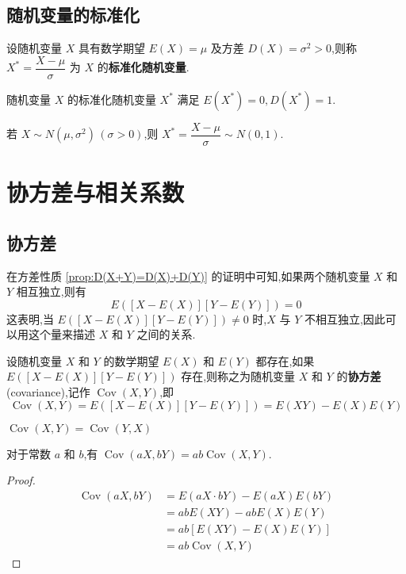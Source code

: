 \subsection{随机变量的标准化}

设随机变量 $X$ 具有数学期望 $E(X)=\mu$ 及方差 $D(X) = \sigma^2 > 0$,则称 $X^* = \dfrac{X-\mu}{\sigma}$ 为 $X$ 的\textbf{标准化随机变量}.

随机变量 $X$ 的标准化随机变量 $X^*$ 满足 $E(X^*)=0, D(X^*)=1$.

\vspace{0.5em}

若 $X \sim N(\mu,\sigma^2) \, (\sigma > 0)$,则 $X^* = \dfrac{X-\mu}{\sigma} \sim N(0,1)$.

\section{协方差与相关系数}

\subsection{协方差}

在方差性质 \ref*{prop:D(X+Y)=D(X)+D(Y)} 的证明中可知,如果两个随机变量 $X$ 和 $Y$ 相互独立,则有
$$
E([X-E(X)][Y-E(Y)]) = 0
$$
这表明,当 $E([X-E(X)][Y-E(Y)]) \not= 0$ 时,$X$ 与 $Y$ 不相互独立,因此可以用这个量来描述 $X$ 和 $Y$ 之间的关系.

\begin{definition}
    设随机变量 $X$ 和 $Y$ 的数学期望 $E(X)$ 和 $E(Y)$ 都存在,如果 $E([X-E(X)][Y-E(Y)])$ 存在,则称之为随机变量 $X$ 和 $Y$ 的\textbf{协方差}(covariance),记作 $\operatorname{Cov}(X,Y)$,即
    $$
    \operatorname{Cov}(X,Y) = E([X-E(X)][Y-E(Y)]) = E(XY) - E(X) E(Y)
    $$
\end{definition}

\begin{property}
    $\operatorname{Cov}(X,Y) = \operatorname{Cov}(Y,X)$
\end{property}

\begin{property}
    对于常数 $a$ 和 $b$,有 $\operatorname{Cov}(aX,bY) = ab \operatorname{Cov}(X,Y)$.
\end{property}

\begin{proof}
    $$
    \begin{aligned}
        \operatorname{Cov}(aX,bY) &= E(aX \cdot bY) - E(aX) E(bY) \\
        &= ab E(XY) - ab E(X) E(Y) \\
        &= ab[E(XY) - E(X) E(Y)] \\
        &= ab \operatorname{Cov}(X,Y)
    \end{aligned}
    $$
\end{proof}

